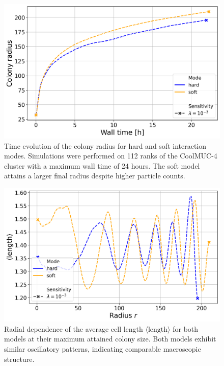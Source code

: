 \documentclass[conference]{IEEEtran}
\begin{document}
\begin{figure}[h]
    \centering
    \includegraphics[width=\linewidth]{figures/comparison_plots/huge_wall_time_vs_radius.png}
    \caption{Time evolution of the colony radius for hard and soft interaction modes. Simulations were performed on 112 ranks of the CoolMUC-4 cluster with a maximum wall time of 24 hours. The soft model attains a larger final radius despite higher particle counts.}
    \label{fig:huge_wall_time_vs_radius}
\end{figure}

\begin{figure}[h]
    \centering
    \includegraphics[width=\linewidth]{figures/comparison_plots/huge_length_shared.png}
    \caption{Radial dependence of the average cell length $\langle \text{length} \rangle$ for both models at their maximum attained colony size. Both models exhibit similar oscillatory patterns, indicating comparable macroscopic structure.}
    \label{fig:huge_length_shared}
\end{figure}
\end{document}
